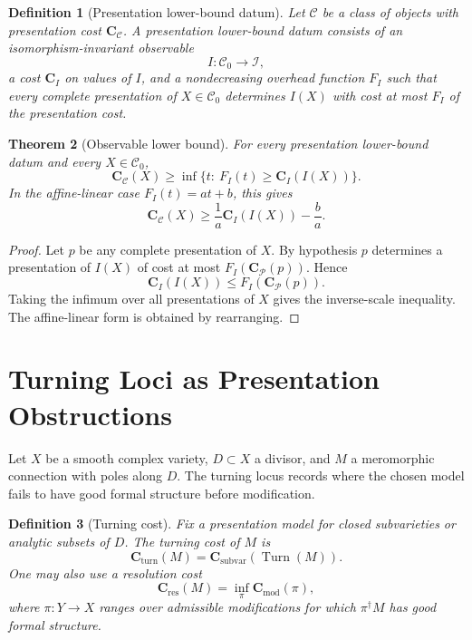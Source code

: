\documentclass[11pt]{article}
\newtheorem{theorem}{Theorem}[section]
\newtheorem{definition}[theorem]{Definition}
\begin{document}
\begin{definition}[Presentation lower-bound datum]
Let \(\mathcal C\) be a class of objects with presentation cost \(\mathbf C_{\mathcal C}\).  A presentation lower-bound datum consists of an isomorphism-invariant observable
\[
I:\mathcal C_0\to \mathcal I,
\]
a cost \(\mathbf C_I\) on values of \(I\), and a nondecreasing overhead function \(F_I\) such that every complete presentation of \(X\in\mathcal C_0\) determines \(I(X)\) with cost at most \(F_I\) of the presentation cost.
\end{definition}

\begin{theorem}[Observable lower bound]
For every presentation lower-bound datum and every \(X\in\mathcal C_0\),
\[
\mathbf C_{\mathcal C}(X)
\ge
\inf\{t:\ F_I(t)\ge \mathbf C_I(I(X))\}.
\]
In the affine-linear case \(F_I(t)=at+b\), this gives
\[
\mathbf C_{\mathcal C}(X)
\ge
\frac{1}{a}\mathbf C_I(I(X))-\frac{b}{a}.
\]
\end{theorem}

\begin{proof}
Let \(p\) be any complete presentation of \(X\).  By hypothesis \(p\) determines a presentation of \(I(X)\) of cost at most \(F_I(\mathbf C_{\mathcal P}(p))\).  Hence
\[
\mathbf C_I(I(X))\le F_I(\mathbf C_{\mathcal P}(p)).
\]
Taking the infimum over all presentations of \(X\) gives the inverse-scale inequality.  The affine-linear form is obtained by rearranging.
\end{proof}

\section{Turning Loci as Presentation Obstructions}

Let \(X\) be a smooth complex variety, \(D\subset X\) a divisor, and \(M\) a meromorphic connection with poles along \(D\).  The turning locus records where the chosen model fails to have good formal structure before modification.

\begin{definition}[Turning cost]
Fix a presentation model for closed subvarieties or analytic subsets of \(D\).  The turning cost of \(M\) is
\[
\mathbf C_{\operatorname{turn}}(M)
=
\mathbf C_{\operatorname{subvar}}(\operatorname{Turn}(M)).
\]
One may also use a resolution cost
\[
\mathbf C_{\operatorname{res}}(M)
=
\inf_{\pi}\mathbf C_{\operatorname{mod}}(\pi),
\]
where \(\pi:Y\to X\) ranges over admissible modifications for which \(\pi^\dagger M\) has good formal structure.
\end{definition}
\end{document}
